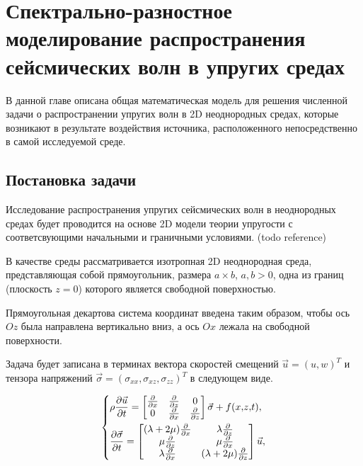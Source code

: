 \section{Спектрально-разностное моделирование распространения сейсмических волн в упругих средах}

В данной главе описана общая математическая модель для решения численной задачи о распространении
упругих волн в 2D неоднородных средах, которые возникают в результате воздействия источника,
расположенного непосредственно в самой исследуемой среде.

\subsection{Постановка задачи}
Исследование распространения упругих сейсмических волн в неоднородных средах будет проводится на 
основе 2D модели теории упругости с соответсвующими начальными и граничными условиями. (todo reference)

В качестве среды рассматривается изотропная 2D неоднородная среда, представляющая собой прямоугольник, размера $a \times b$, $a, b>0$,
одна из границ (плоскость $z = 0$) которого является свободной поверхностью.

Прямоугольная декартова система координат введена таким образом, чтобы ось $Oz$ была направлена вертикально вниз,
а ось $Ox$ лежала на свободной поверхности.


Задача будет записана в терминах вектора скоростей смещений $\vec{u}={(u, w)}^T$
и тензора напряжений $\vec{\sigma}=(\sigma_{xx}, \sigma_{xz}, \sigma_{zz})^T$ в следующем виде.

\begin{equation}
\label{eq:1}
\begin{dcases}
	\rho\frac{\partial{\vec{u}}}{\partial{t}}
	=\begin{bmatrix}
    \frac{\partial{}}{\partial{x}} & \frac{\partial{}}{\partial{z}} & 0 \\
    0 & \frac{\partial{}}{\partial{x}} & \frac{\partial{}}{\partial{z}}
	\end{bmatrix}
	\vec{\sigma} + f(x{,} z{,} t), \\
	\frac{\partial{\vec{\sigma}}}{\partial{t}}
	=\begin{bmatrix}
    (\lambda+2\mu)\frac{\partial{}}{\partial{x}} & \lambda\frac{\partial{}}{\partial{z}} \\
    \mu\frac{\partial{}}{\partial{z}} & \mu\frac{\partial{}}{\partial{x}} \\
    \lambda\frac{\partial{}}{\partial{x}} & (\lambda+2\mu)\frac{\partial{}}{\partial{z}}
	\end{bmatrix}
	\vec{u},
\end{dcases}
\end{equation}


